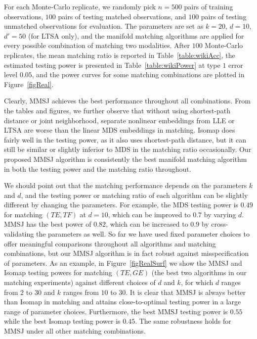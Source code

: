 \documentclass[times,twocolumn,final]{elsarticle}
\begin{document}
For each Monte-Carlo replicate, we randomly pick $n=500$ pairs of training observations, $100$ pairs of testing matched observations, and $100$ pairs of testing unmatched observations for evaluation. The parameters are set as $k=20$, $d=10$, $d'=50$ (for LTSA only), and the manifold matching algorithms are applied for every possible combination of matching two modalities. After $100$ Monte-Carlo replicates, the mean matching ratio is reported in Table~\ref{table:wikiAcc}, the estimated testing power is presented in Table~\ref{table:wikiPower} at type $1$ error level $0.05$, and the power curves for some matching combinations are plotted in Figure~\ref{figReal}. 

Clearly, MMSJ achieves the best performance throughout all combinations. From the tables and figures, we further observe that without using shortest-path distance or joint neighborhood, separate nonlinear embeddings from LLE or LTSA are worse than the linear MDS embeddings in matching. Isomap does fairly well in the testing power, as it also uses shortest-path distance, but it can still be similar or slightly inferior to MDS in the matching ratio occasionally. Our proposed MMSJ algorithm is consistently the best manifold matching algorithm in both the testing power and the matching ratio throughout.

We should point out that the matching performance depends on the parameters $k$ and $d$, and the testing power or matching ratio of each algorithm can be slightly different by changing the parameters. For example, the MDS testing power is $0.49$ for matching $(TE, TF)$ at $d=10$, which can be improved to $0.7$ by varying $d$. MMSJ has the best power of $0.82$, which can be increased to $0.9$ by cross-validating the parameters as well. So far we have used fixed parameter choices to offer meaningful comparisons throughout all algorithms and matching combinations, but our MMSJ algorithm is in fact robust against misspecification of parameters. As an example, in Figure~\ref{figRealSurf} we show the MMSJ and Isomap testing powers for matching $(TE,GE)$ (the best two algorithms in our matching experiments) against different choices of $d$ and $k$, for which $d$ ranges from $2$ to $30$ and $k$ ranges from $10$ to $30$. It is clear that MMSJ is always better than Isomap in matching and attains close-to-optimal testing power in a large range of parameter choices. Furthermore, the best MMSJ testing power is $0.55$ while the best Isomap testing power is $0.45$. The same robustness holds for MMSJ under all other matching combinations. 
\end{document}
